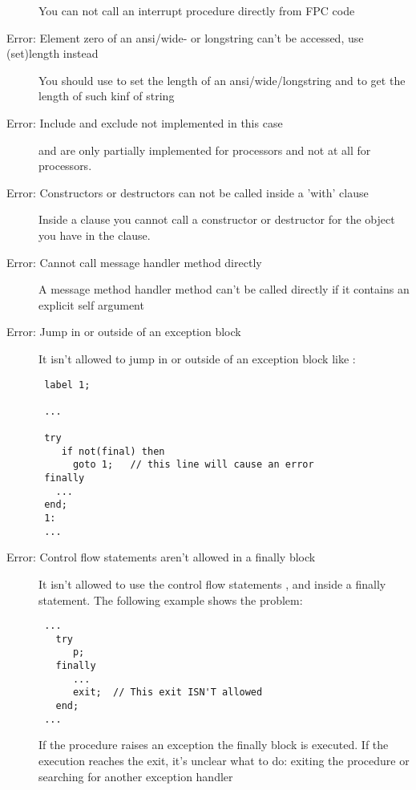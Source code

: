 \begin{description}
 You can not call an interrupt procedure directly from FPC code
\item [Error: Element zero of an ansi/wide- or longstring can't be accessed, use (set)length instead]
 You should use  to set the length of an ansi/wide/longstring
 and  to get the length of such kinf of string
\item [Error: Include and exclude not implemented in this case]
  and  are only partially
 implemented for  processors
 and not at all for  processors.
\item [Error: Constructors or destructors can not be called inside a 'with' clause]
 Inside a  clause you cannot call a constructor or destructor for the
 object you have in the  clause.
\item [Error: Cannot call message handler method directly]
 A message method handler method can't be called directly if it contains an
 explicit self argument
\item [Error: Jump in or outside of an exception block]
 It isn't allowed to jump in or outside of an exception block like :
 \begin{verbatim}
 label 1;

 ...

 try
    if not(final) then
      goto 1;   // this line will cause an error
 finally
   ...
 end;
 1:
 ...
 \end{verbatim}
\item [Error: Control flow statements aren't allowed in a finally block]
 It isn't allowed to use the control flow statements ,
  and 
 inside a finally statement. The following example shows the problem:
 \begin{verbatim}
 ...
   try
      p;
   finally
      ...
      exit;  // This exit ISN'T allowed
   end;
 ...

 \end{verbatim}
 If the procedure  raises an exception the finally block is
 executed. If the execution reaches the exit, it's unclear what to do:
 exiting the procedure or searching for another exception handler
 \end{description}

